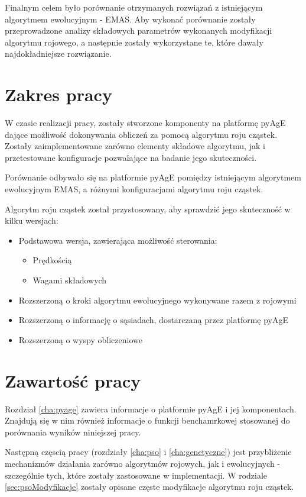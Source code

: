 Finalnym celem było porównanie otrzymanych rozwiązań z istniejącym algorytmem ewolucyjnym - EMAS. Aby wykonać porównanie zostały przeprowadzone analizy składowych parametrów wykonanych modyfikacji algorytmu rojowego, a następnie zostały wykorzystane te, które dawały najdokładniejsze rozwiązanie.


\section{Zakres pracy}
W czasie realizacji pracy, zostały stworzone komponenty na platformę pyAgE dające możliwość dokonywania obliczeń za pomocą algorytmu roju cząstek. Zostały zaimplementowane zarówno elementy składowe algorytmu, jak i przetestowane konfiguracje pozwalające na badanie jego skuteczności. 

Porównanie odbywało się na platformie pyAgE pomiędzy istniejącym algorytmem ewolucyjnym EMAS, a różnymi konfiguracjami algorytmu roju cząstek. 

Algorytm roju cząstek został przystosowany, aby sprawdzić jego skuteczność w kilku wersjach:
\begin{itemize}
\item Podstawowa wersja, zawierająca możliwość sterowania:
\begin{itemize}
\item Prędkością
\item Wagami składowych
\end{itemize}
\item Rozszerzoną o kroki algorytmu ewolucyjnego wykonywane razem z rojowymi
\item Rozszerzoną o informację o sąsiadach, dostarczaną przez platformę pyAgE
\item Rozszerzoną o wyspy obliczeniowe
\end{itemize}


\section{Zawartość pracy}
Rozdział \ref{cha:pyage} zawiera informacje o platformie pyAgE i jej komponentach. Znajdują się w nim również informacje o funkcji benchamrkowej stosowanej do porównania wyników niniejszej pracy.

Następną częscią pracy (rozdziały \ref{cha:pso} i \ref{cha:genetyczne}) jest przybliżenie mechanizmów działania zarówno algorytmów rojowych, jak i ewolucyjnych - szczególnie tych, które zostały zastosowane w implementacji. W rodziale \ref{sec:psoModyfikacje} zostały opisane częste modyfikacje algorytmu roju cząstek.

